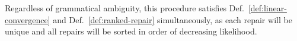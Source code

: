\documentclass[runningheads]{llncs}
\begin{document}
Regardless of grammatical ambiguity, this procedure satisfies Def.~\ref{def:linear-convergence} and Def.~\ref{def:ranked-repair} simultaneously, as each repair will be unique and all repairs will be sorted in order of decreasing likelihood.

%
%
%
%
\end{document}
